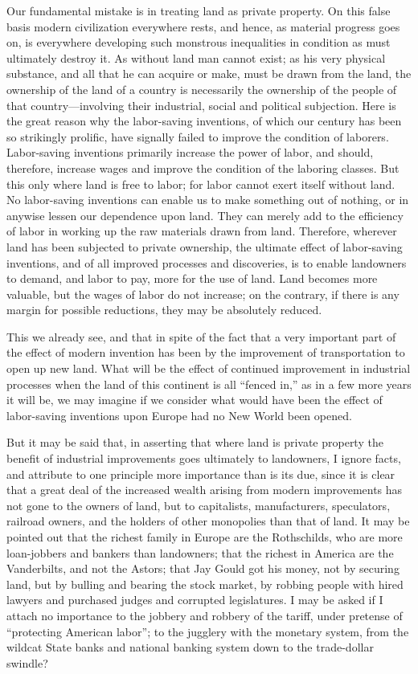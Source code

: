 \documentclass{book}
\begin{document}
Our fundamental mistake is in treating land as private property. On this false basis modern civilization everywhere rests, and hence, as material progress goes on, is everywhere developing such monstrous inequalities in condition as must ultimately destroy it. As without land man cannot exist; as his very physical substance, and all that he can acquire or make, must be drawn from the land, the ownership of the land of a country is necessarily the ownership of the people of that country—involving their industrial, social and political subjection. Here is the great reason why the labor-saving inventions, of which our century has been so strikingly prolific, have signally failed to improve the condition of laborers. Labor-saving inventions primarily increase the power of labor, and should, therefore, increase wages and improve the condition of the laboring classes. But this only where land is free to labor; for labor cannot exert itself without land. No labor-saving inventions can enable us to make something out of nothing, or in anywise lessen our dependence upon land. They can merely add to the efficiency of labor in working up the raw materials drawn from land. Therefore, wherever land has been subjected to private ownership, the ultimate effect of labor-saving inventions, and of all improved processes and discoveries, is to enable landowners to demand, and labor to pay, more for the use of land. Land becomes more valuable, but the wages of labor do not increase; on the contrary, if there is any margin for possible reductions, they may be absolutely reduced.

This we already see, and that in spite of the fact that a very important part of the effect of modern invention has been by the improvement of transportation to open up new land. What will be the effect of continued improvement in industrial processes when the land of this continent is all “fenced in,” as in a few more years it will be, we may imagine if we consider what would have been the effect of labor-saving inventions upon Europe had no New World been opened.

But it may be said that, in asserting that where land is private property the benefit of industrial improvements goes ultimately to landowners, I ignore facts, and attribute to one principle more importance than is its due, since it is clear that a great deal of the increased wealth arising from modern improvements has not gone to the owners of land, but to capitalists, manufacturers, speculators, railroad owners, and the holders of other monopolies than that of land. It may be pointed out that the richest family in Europe are the Rothschilds, who are more loan-jobbers and bankers than landowners; that the richest in America are the Vanderbilts, and not the Astors; that Jay Gould got his money, not by securing land, but by bulling and bearing the stock market, by robbing people with hired lawyers and purchased judges and corrupted legislatures. I may be asked if I attach no importance to the jobbery and robbery of the tariff, under pretense of “protecting American labor”; to the jugglery with the monetary system, from the wildcat State banks and national banking system down to the trade-dollar swindle?
\end{document}
